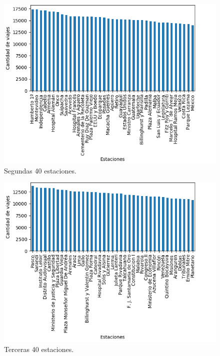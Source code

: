 \begin{enumerate}
\begin{itemize}
\begin{figure}[H]
    \centering
    \includegraphics[scale=0.8]{imagenes/nombreOrigenEst2.png}
    \caption{Segundas 40 estaciones.}
 \label{fig: cluster}
\end{figure}

\begin{figure}[H]
    \centering
    \includegraphics[scale=0.8]{imagenes/nombreOrigenEst3.png}
    \caption{Terceras 40 estaciones.}
 \label{fig: cluster}
\end{figure}


\end{itemize}
\end{enumerate}
